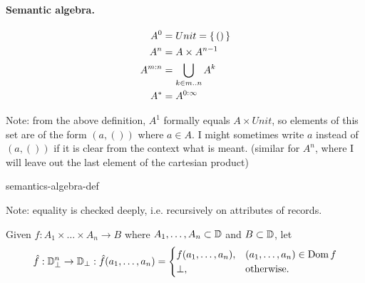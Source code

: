 \begin{defbox}
\paragraph{Semantic algebra.}
\begin{align*}
A^0 &= Unit = \left\{\,()\,\right\} \\
A^n &= A \times A^{n-1} \\
A^{m:n} &= \bigcup_{k \in m..n} A^k \\
A^{*} &= A^{0:\infty}
\end{align*}

Note: from the above definition, $A^1$ formally equals $A \times Unit$, so elements of this set are of the form $(a, ())$ where $a \in A$. I might sometimes write $a$ instead of $(a, ())$ if it is clear from the context what is meant. (similar for $A^n$, where I will leave out the last element of the cartesian product)

{semantics-algebra-def}

Note: equality is checked deeply, i.e. recursively on attributes of records.


Given $f : A_1 \times \dots \times A_n \to B$ where $A_1, \dots, A_n \subset \mathbb{D}$ and $B \subset \mathbb{D}$, let
\begin{equation*}
\hat{f} : \mathbb{D}_\bot^n \to \mathbb{D}_\bot : \hat{f}(a_1, \dots, a_n) =
\begin{cases}
f(a_1, \dots, a_n), & (a_1, \dots, a_n) \in \operatorname{Dom}{f} \\
\bot, & \text{otherwise.}
\end{cases}
\end{equation*}
\end{defbox}
